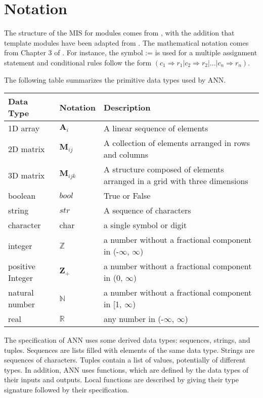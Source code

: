 \documentclass[12pt, titlepage]{article}
\begin{document}
\section{Notation}


The structure of the MIS for modules comes from \citet{HoffmanAndStrooper1995},
with the addition that template modules have been adapted from
\cite{GhezziEtAl2003}.  The mathematical notation comes from Chapter 3 of
\citet{HoffmanAndStrooper1995}.  For instance, the symbol := is used for a
multiple assignment statement and conditional rules follow the form $(c_1
\Rightarrow r_1 | c_2 \Rightarrow r_2 | ... | c_n \Rightarrow r_n )$.

The following table summarizes the primitive data types used by ANN. 

\begin{center}
\renewcommand{\arraystretch}{1.2}
\noindent 
\begin{tabular}{l l p{7.5cm}} 
\toprule 
\textbf{Data Type} & \textbf{Notation} & \textbf{Description}\\ 
\midrule
1D array & $\mathbf{A}_{i}$ & A linear sequence of elements\\
2D matrix & $\mathbf{M}_{ij}$ &  A collection of elements arranged in rows and columns\\
3D matrix & $\mathbf{M}_{ijk}$ & A structure composed of elements arranged in a grid with three dimensions\\ 
boolean & $bool$ & True or False\\
string & $str$ & A sequence of characters\\
character & char & a single symbol or digit\\
integer & $\mathbb{Z}$ & a number without a fractional component in (-$\infty$, $\infty$) \\
positive Integer & $\mathbf{Z}_{+}$ & a number without a fractional component in ($0$, $\infty$) \\
natural number & $\mathbb{N}$ & a number without a fractional component in [1, $\infty$) \\
real & $\mathbb{R}$ & any number in (-$\infty$, $\infty$)\\
\bottomrule
\end{tabular} 
\end{center}

\noindent
The specification of ANN uses some derived data types: sequences, strings, and
tuples. Sequences are lists filled with elements of the same data type. Strings
are sequences of characters. Tuples contain a list of values, potentially of
different types. In addition, ANN uses functions, which
are defined by the data types of their inputs and outputs. Local functions are
described by giving their type signature followed by their specification.
\end{document}
